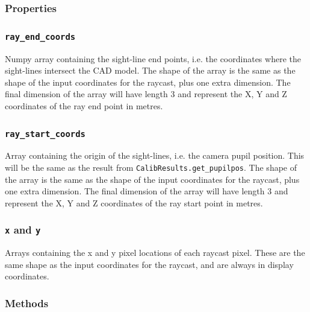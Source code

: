 \documentclass[12pt]{article}
\newcommand{\code}[1]{\texttt{#1}}
\begin{document}
\subsubsection{Properties}

\subsubsection*{\code{ray\_end\_coords}}
\begin{adjustwidth}{0.5cm}{0cm}
Numpy array containing the sight-line end points, i.e. the coordinates where the sight-lines intersect the CAD model. The shape of the array is the same as the shape of the input coordinates for the raycast, plus one extra dimension. The final dimension of the array will have length 3 and represent the X, Y and Z coordinates of the ray end point in metres.
\end{adjustwidth}

\subsubsection*{\code{ray\_start\_coords}}
\begin{adjustwidth}{0.5cm}{0cm}
Array containing the origin of the sight-lines, i.e. the camera pupil position. This will be the same as the result from \code{CalibResults.get\_pupilpos}.  The shape of the array is the same as the shape of the input coordinates for the raycast, plus one extra dimension. The final dimension of the array will have length 3 and represent the X, Y and Z coordinates of the ray start point in metres.

\end{adjustwidth}

\subsubsection*{\code{x} and \code{y}}
\begin{adjustwidth}{0.5cm}{0cm}
Arrays containing the x and y pixel locations of each raycast pixel. These are the same shape as  the input coordinates for the raycast, and are always in display coordinates.
\end{adjustwidth}


\subsubsection{Methods}
\end{document}
